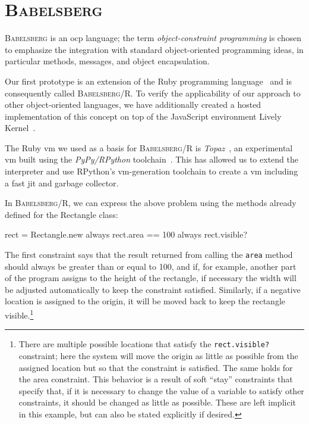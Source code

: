 \documentclass[english, inproceedings]{polze}
\newcommand{\ac}[1]{\gls{#1}}
\newcommand{\langname}{\textsc{Babelsberg}\xspace}
\newcommand{\toolname}{\textsc{Babelsberg/R}\xspace}
\begin{document}
\section{\langname}
\label{sec:babelsberg}
\langname is an \ac{ocp} language; the term \emph{object-constraint
  programming} is chosen to emphasize the integration with standard
object-oriented programming ideas, in particular methods, messages,
and object encapsulation.

Our first prototype is an extension of the Ruby programming
language~\cite{flanagan2008ruby} and is consequently called
\toolname. To verify the applicability of our approach to other
object-oriented languages, we have additionally created a hosted
implementation of this concept on top of the JavaScript environment
Lively Kernel~\cite{lincke2012lively}.

The Ruby \ac{vm} we used as a basis for \toolname is
\emph{Topaz}~\cite{FelgentreffTopazWroclove2013}, an experimental
\ac{vm} built using the \emph{PyPy/RPython}
toolchain~\cite{rigo2006pypy}. This has allowed us to extend the
interpreter and use RPython's \ac{vm}-generation toolchain to create a
\ac{vm} including a fast \ac{jit} and garbage collector.

In \toolname, we can express the above problem using the methods
already defined for the Rectangle class:
\begin{code}
rect = Rectangle.new
always { rect.area == 100 }
always { rect.visible? }
\end{code}

The first constraint says that the result returned from calling the
\lstinline{area} method should always be greater than or equal to 100,
and if, for example, another part of the program assigns to the height
of the rectangle, if necessary the width will be adjusted
automatically to keep the constraint satisfied.  Similarly, if a
negative location is assigned to the origin, it will be moved back to
keep the rectangle visible.\footnote{There are multiple possible
  locations that satisfy the \lstinline{rect.visible?} constraint;
  here the system will move the origin as little as possible from the
  assigned location but so that the constraint is satisfied.  The same
  holds for the area constraint.  This behavior is a result of soft
  ``stay'' constraints that specify that, if it is necessary to change
  the value of a variable to satisfy other constraints, it should be
  changed as little as possible.  These are left implicit in this
  example, but can also be stated explicitly if desired.}
\end{document}

